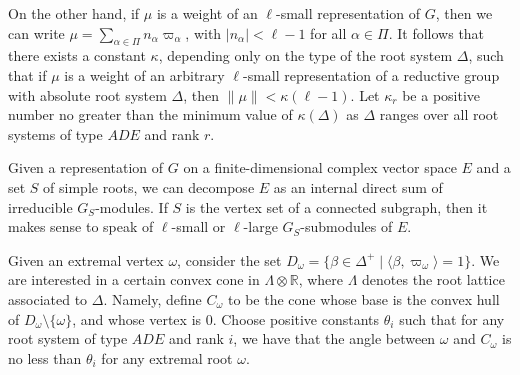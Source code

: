 \documentclass{amsart}
\theoremstyle{plain}
\theoremstyle{definition}
\theoremstyle{remark}
\providecommand{\abs}[1]{\lvert#1\rvert}
\providecommand{\norm}[1]{\lVert#1\rVert}
\begin{document}
On the other hand, if $\mu$ is a weight of an $\ell$-small representation of $G$, then
we can write $\mu = \sum_{\alpha \in \Pi} n_{\alpha} \varpi_{\alpha}$, with
$\abs{n_{\alpha}} < \ell - 1$ for all $\alpha \in \Pi$.
It follows that there exists a constant $\kappa$, depending only on the type of the root
system $\Delta$, such that if $\mu$ is a weight of an arbitrary $\ell$-small
representation of a reductive group with absolute root system $\Delta$, then $\norm{\mu}
< \kappa(\ell - 1)$. Let $\kappa_{r}$ be a positive number no greater than the
minimum value of $\kappa(\Delta)$ as $\Delta$ ranges over all root systems of type $ADE$
and rank $r$.

Given a representation of $G$ on a finite-dimensional complex vector space $E$ and a set
$S$ of simple roots, we can decompose $E$ as an internal
direct sum of irreducible $G_{S}$-modules.
If $S$ is the vertex set of a connected subgraph, then it makes sense to speak of
$\ell$-small or $\ell$-large $G_{S}$-submodules of $E$.

Given an extremal vertex $\omega$, consider the set $D_{\omega} =
\{\beta \in \Delta^{+} \mid \langle \beta, \varpi_{\omega} \rangle
= 1\}$. We are interested in a certain convex cone in $\Lambda
\otimes \mathbb{R}$, where $\Lambda$ denotes the root lattice
associated to $\Delta$. Namely, define $C_{\omega}$ to be the cone
whose base is the convex hull of $D_{\omega} \setminus
\{\omega\}$, and whose vertex is $0$. Choose positive constants
$\theta_{i}$ such that for any root system of type $ADE$ and rank
$i$, we have that the angle between $\omega$ and $C_{\omega}$ is
no less than $\theta_{i}$ for any extremal root $\omega$.
\end{document}
